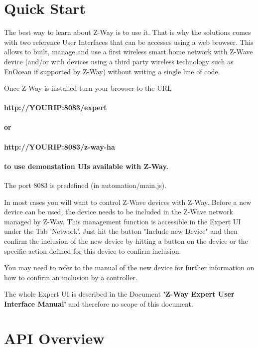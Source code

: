 \section{Quick Start}

The best way to learn about Z-Way is to use it. That is why the solutions comes with two
reference User Interfaces that can be accesses using a web browser. This allows to 
built, manage and use a first wireless smart home network with Z-Wave device (and/or with
devices using a third party wireless technology such as EnOcean if supported by Z-Way) 
without writing a single line of code.
 
Once Z-Way is installed turn your browser to the URL

\paragraph{http://YOURIP:8083/expert}

\paragraph{or}

\paragraph{http://YOURIP:8083/z-way-ha} 

 
\paragraph{to use demonstation UIs available with Z-Way.} The port 8083 is predefined
(in automation/main.js).

In most cases you will want to control Z-Wave devices with Z-Way. Before a new device 
can be used, the device needs to be included in the Z-Wave network managed by Z-Way.
This management function is accessible in the Expert UI under the Tab 'Network'. 
Just hit the button "Include new Device" and then confirm the inclusion of the new device 
by hitting a button on the device or the specific action defined for this device to 
confirm inclusion.

You may need to refer to the manual of the new device for further information on how 
to confirm an inclusion by a controller.

The whole Expert UI is described in the Document 
\textbf{'Z-Way Expert User Interface Manual'} and therefore no scope of this document.


\section{API Overview}

